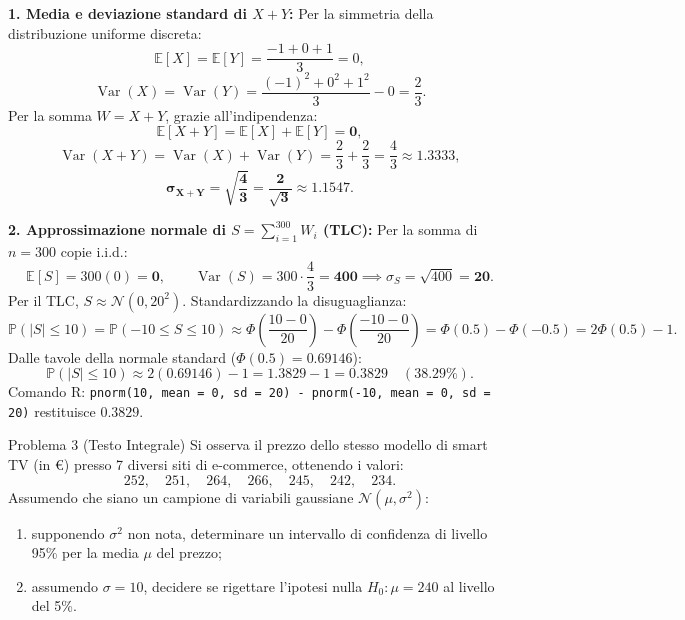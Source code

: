 \documentclass[11pt,a4paper]{article}
\newcommand{\EE}{\mathbb{E}}
\newcommand{\Prob}{\mathbb{P}}
\newcommand{\Var}{\operatorname{Var}}
\begin{document}
\begin{soluzionebox}
\textbf{1. Media e deviazione standard di $X+Y$:}
Per la simmetria della distribuzione uniforme discreta:
\[
\EE[X] = \EE[Y] = \frac{-1 + 0 + 1}{3} = 0,
\]
\[
\Var(X) = \Var(Y) = \frac{(-1)^2 + 0^2 + 1^2}{3} - 0 = \frac{2}{3}.
\]
Per la somma $W = X+Y$, grazie all'indipendenza:
\[
\EE[X+Y] = \EE[X] + \EE[Y] = \bm{0},
\]
\[
\Var(X+Y) = \Var(X) + \Var(Y) = \frac{2}{3} + \frac{2}{3} = \frac{4}{3} \approx 1.3333,
\]
\[
\bm{\sigma_{X+Y} = \sqrt{\frac{4}{3}} = \frac{2}{\sqrt{3}} \approx 1.1547}.
\]

\textbf{2. Approssimazione normale di $S = \sum_{i=1}^{300} W_i$ (TLC):}
Per la somma di $n = 300$ copie i.i.d.:
\[
\EE[S] = 300(0) = \bm{0}, \qquad \Var(S) = 300 \cdot \frac{4}{3} = \bm{400} \implies \sigma_S = \sqrt{400} = \bm{20}.
\]
Per il TLC, $S \approx \mathcal{N}(0, 20^2)$.
Standardizzando la disuguaglianza:
\[
\Prob(|S| \le 10) = \Prob(-10 \le S \le 10) \approx \Phi\left(\frac{10 - 0}{20}\right) - \Phi\left(\frac{-10 - 0}{20}\right) = \Phi(0.5) - \Phi(-0.5) = 2\Phi(0.5) - 1.
\]
Dalle tavole della normale standard ($\Phi(0.5) = 0.69146$):
\[
\Prob(|S| \le 10) \approx 2(0.69146) - 1 = 1.3829 - 1 = \bm{0.3829} \quad (\bm{38.29\%}).
\]
Comando R: \texttt{pnorm(10, mean = 0, sd = 20) - pnorm(-10, mean = 0, sd = 20)} restituisce $0.3829$.
\end{soluzionebox}

\begin{problemabox}{Problema 3 (Testo Integrale)}
Si osserva il prezzo dello stesso modello di smart TV (in €) presso 7 diversi siti di e-commerce, ottenendo i valori:
\[
252, \quad 251, \quad 264, \quad 266, \quad 245, \quad 242, \quad 234.
\]
Assumendo che siano un campione di variabili gaussiane $\mathcal{N}(\mu, \sigma^2)$:
\begin{enumerate}
    \item supponendo $\sigma^2$ non nota, determinare un intervallo di confidenza di livello 95\% per la media $\mu$ del prezzo;
    \item assumendo $\sigma = 10$, decidere se rigettare l'ipotesi nulla $H_0: \mu = 240$ al livello del 5\%.
\end{enumerate}
\end{problemabox}
\end{document}
